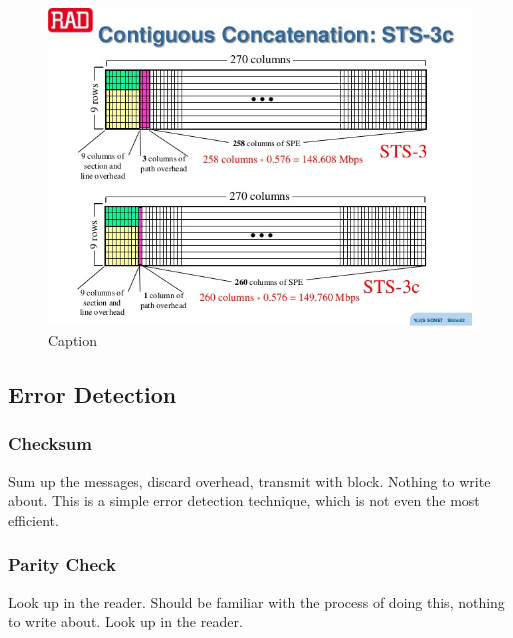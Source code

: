 \documentclass[11pt, a4paper]{article}
\begin{document}
\begin{figure}[H]
    \centering
    \includegraphics[width = \textwidth]{Pictures/sonet STS 3c vs STS 3.jpg}
    \caption{Caption}
    \label{fig:my_label}
\end{figure}

\subsection{Error Detection}
\subsubsection{Checksum}
Sum up the messages, discard overhead, transmit with block. Nothing to write about. This is a simple error detection technique, which is not even the most efficient.
\subsubsection{Parity Check}
Look up in the reader. Should be familiar with the process of doing this, nothing to write about. Look up in the reader.
\end{document}

